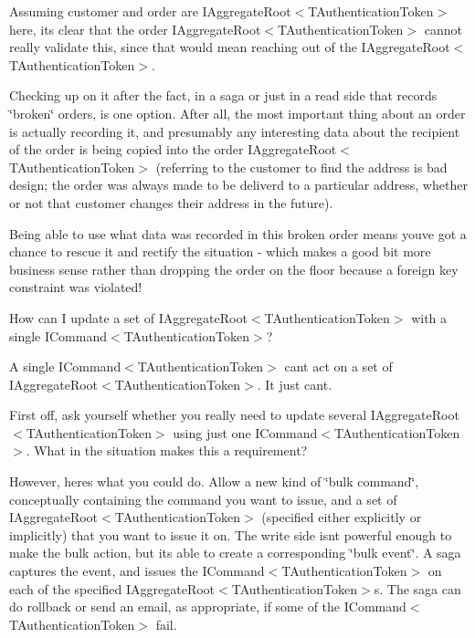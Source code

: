 Assuming customer and order are I\+Aggregate\+Root$<$\+T\+Authentication\+Token$>$ here, it\textquotesingle{}s clear that the order I\+Aggregate\+Root$<$\+T\+Authentication\+Token$>$ cannot really validate this, since that would mean reaching out of the I\+Aggregate\+Root$<$\+T\+Authentication\+Token$>$. 

Checking up on it after the fact, in a saga or just in a read side that records \char`\"{}broken\char`\"{} orders, is one option. After all, the most important thing about an order is actually recording it, and presumably any interesting data about the recipient of the order is being copied into the order I\+Aggregate\+Root$<$\+T\+Authentication\+Token$>$ (referring to the customer to find the address is bad design; the order was always made to be deliverd to a particular address, whether or not that customer changes their address in the future). 

Being able to use what data was recorded in this broken order means you\textquotesingle{}ve got a chance to rescue it and rectify the situation -\/ which makes a good bit more business sense rather than dropping the order on the floor because a foreign key constraint was violated! 

How can I update a set of I\+Aggregate\+Root$<$\+T\+Authentication\+Token$>$ with a single I\+Command$<$\+T\+Authentication\+Token$>$? 

A single I\+Command$<$\+T\+Authentication\+Token$>$ can\textquotesingle{}t act on a set of I\+Aggregate\+Root$<$\+T\+Authentication\+Token$>$. It just can\textquotesingle{}t. 

First off, ask yourself whether you really need to update several I\+Aggregate\+Root$<$\+T\+Authentication\+Token$>$ using just one I\+Command$<$\+T\+Authentication\+Token$>$. What in the situation makes this a requirement? 

However, here\textquotesingle{}s what you could do. Allow a new kind of \char`\"{}bulk command\char`\"{}, conceptually containing the command you want to issue, and a set of I\+Aggregate\+Root$<$\+T\+Authentication\+Token$>$ (specified either explicitly or implicitly) that you want to issue it on. The write side isn\textquotesingle{}t powerful enough to make the bulk action, but it\textquotesingle{}s able to create a corresponding \char`\"{}bulk event\char`\"{}. A saga captures the event, and issues the I\+Command$<$\+T\+Authentication\+Token$>$ on each of the specified I\+Aggregate\+Root$<$\+T\+Authentication\+Token$>$s. The saga can do rollback or send an email, as appropriate, if some of the I\+Command$<$\+T\+Authentication\+Token$>$ fail. 

